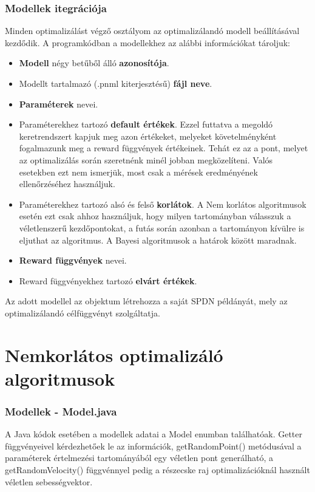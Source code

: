 \subsubsection{Modellek itegrációja}
Minden optimalizálást végző osztályom az optimalizálandó modell beállításával kezdődik. A programkódban a modellekhez az alábbi információkat tároljuk:
\begin{itemize}
	\item \textbf{Modell} négy betűből álló \textbf{azonosítója}.
	\item Modellt tartalmazó (.pnml kiterjesztésű) \textbf{fájl neve}.
	\item \textbf{Paraméterek} nevei.
	\item Paraméterekhez tartozó \textbf{default értékek}. Ezzel futtatva a megoldó keretrendszert kapjuk meg azon értékeket, melyeket követelményként fogalmazunk meg a reward függvények értékeinek. Tehát ez az a pont, melyet az optimalizálás során szeretnénk minél jobban megközelíteni. Valós esetekben ezt nem ismerjük, most csak a mérések eredményének ellenőrzéséhez használjuk.
	\item Paraméterekhez tartozó alsó és felső \textbf{korlátok}. A Nem korlátos algoritmusok esetén ezt csak ahhoz használjuk, hogy milyen tartományban válasszuk a véletlenszerű kezdőpontokat, a futás során azonban a tartományon kívülre is eljuthat az algoritmus. A Bayesi algoritmusok a határok között maradnak.
	\item \textbf{Reward függvények} nevei.
	\item Reward függvényekhez tartozó \textbf{elvárt értékek}.
\end{itemize}

Az adott modellel az objektum létrehozza a saját SPDN példányát, mely az optimalizálandó célfüggvényt szolgáltatja.

\section{Nemkorlátos optimalizáló algoritmusok}

\subsubsection{Modellek - Model.java}
A Java kódok esetében a modellek adatai a Model enumban találhatóak. Getter függvényeivel kérdezhetőek le az információk, getRandomPoint() metódusával a paraméterek értelmezési tartományából egy véletlen pont generálható, a getRandomVelocity() függvénnyel pedig a részecske raj optimalizációknál használt véletlen sebességvektor.

